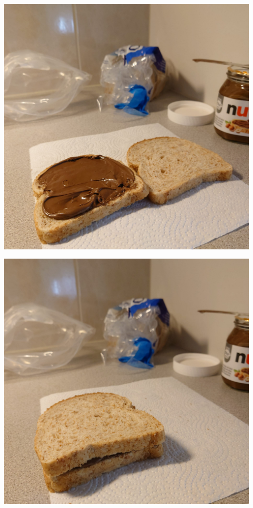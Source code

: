 \begin{multicols}{2}
\begin{Figure}\begin{center}
\noindent\includegraphics[width=0.9\linewidth]{assets/valipala3}
\end{center}\end{Figure}
\begin{Figure}\begin{center}
\noindent\includegraphics[width=0.9\linewidth]{assets/valipala4}
\end{center}\end{Figure}
\end{multicols}

